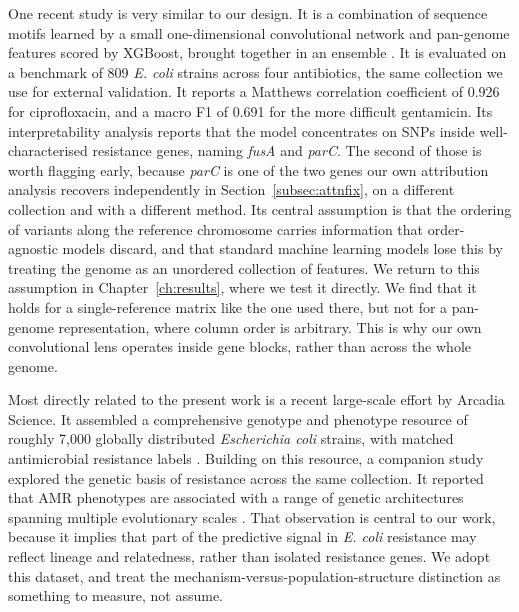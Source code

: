 \vspace{1em}

One recent study is very similar to our design. It is a combination of sequence motifs learned by a small one-dimensional convolutional network and pan-genome features scored by XGBoost, brought together in an ensemble \cite{siddiqui2025amrensemble}. It is evaluated on a benchmark of 809 \textit{E. coli} strains across four antibiotics, the same collection we use for external validation. It reports a Matthews correlation coefficient of 0.926 for ciprofloxacin, and a macro F1 of 0.691 for the more difficult gentamicin. Its interpretability analysis reports that the model concentrates on SNPs inside well-characterised resistance genes, naming \textit{fusA} and \textit{parC}. The second of those is worth flagging early, because \textit{parC} is one of the two genes our own attribution analysis recovers independently in Section~\ref{subsec:attnfix}, on a different collection and with a different method. Its central assumption is that the ordering of variants along the reference chromosome carries information that order-agnostic models discard, and that standard machine learning models lose this by treating the genome as an unordered collection of features. We return to this assumption in Chapter~\ref{ch:results}, where we test it directly. We find that it holds for a single-reference matrix like the one used there, but not for a pan-genome representation, where column order is arbitrary. This is why our own convolutional lens operates inside gene blocks, rather than across the whole genome.

\vspace{1em}

Most directly related to the present work is a recent large-scale effort by Arcadia Science. It assembled a comprehensive genotype and phenotype resource of roughly 7,000 globally distributed \textit{Escherichia coli} strains, with matched antimicrobial resistance labels \cite{morin2024ecoli}. Building on this resource, a companion study explored the genetic basis of resistance across the same collection. It reported that AMR phenotypes are associated with a range of genetic architectures spanning multiple evolutionary scales \cite{york2025amr}. That observation is central to our work, because it implies that part of the predictive signal in \textit{E. coli} resistance may reflect lineage and relatedness, rather than isolated resistance genes. We adopt this dataset, and treat the mechanism-versus-population-structure distinction as something to measure, not assume.

